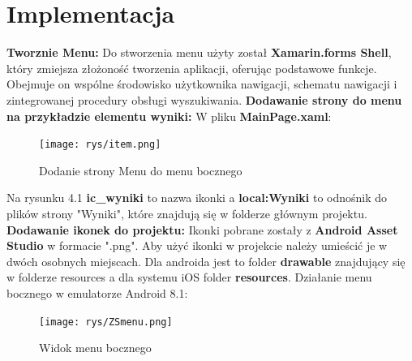 	\newpage
\section{Implementacja}		%
\textbf{Tworznie Menu:} \newline 
Do stworzenia menu użyty został \textbf{Xamarin.forms Shell}, który zmiejsza złożoność tworzenia aplikacji, oferując podstawowe funkcje. Obejmuje on wspólne środowisko użytkownika nawigacji, schematu nawigacji i zintegrowanej procedury obsługi wyszukiwania.
\newline
\newline
\textbf{Dodawanie strony do menu na przykładzie elementu wyniki:}
\newline
W pliku \textbf{MainPage.xaml}:
\newline
\newline
\begin{figure}[!htb]
	\begin{center}
		\texttt{[image: rys/item.png]}
		\caption{Dodanie strony Menu do menu bocznego}
		\label{rys:rysunek012}
	\end{center}
\end{figure}
\newline
Na rysunku 4.1 \textbf{ic\_wyniki} to nazwa ikonki a \textbf{local:Wyniki} to odnośnik do plików strony "Wyniki", które znajdują się w folderze głównym projektu. 
\newline
\newline
\textbf{Dodawanie ikonek do projektu:} \newline
Ikonki pobrane zostały z \textbf{Android Asset Studio} w formacie ".png". \newline
Aby użyć ikonki w projekcie należy umieścić je w dwóch osobnych miejscach. Dla androida jest to folder \textbf{drawable} znajdujący się w folderze resources a dla systemu iOS folder \textbf{resources}.
\newline \newline
\newpage
Działanie menu bocznego w emulatorze Android 8.1:
\begin{figure}[!htb]
	\begin{center}
		\texttt{[image: rys/ZSmenu.png]}
		\caption{Widok menu bocznego}
		\label{rys:rysunek013}
	\end{center}
\end{figure}

